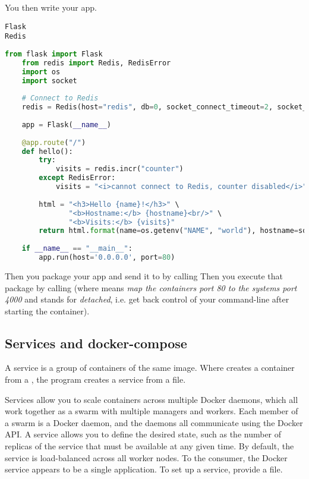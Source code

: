 You then write your app. 
\begin{lstlisting}[caption=requirements.txt]
Flask
Redis
\end{lstlisting}

\begin{lstlisting}[language=python, caption=main.py]
    from flask import Flask
    from redis import Redis, RedisError
    import os
    import socket
    
    # Connect to Redis
    redis = Redis(host="redis", db=0, socket_connect_timeout=2, socket_timeout=2)
    
    app = Flask(__name__)
    
    @app.route("/")
    def hello():
        try:
            visits = redis.incr("counter")
        except RedisError:
            visits = "<i>cannot connect to Redis, counter disabled</i>"
    
        html = "<h3>Hello {name}!</h3>" \
               "<b>Hostname:</b> {hostname}<br/>" \
               "<b>Visits:</b> {visits}"
        return html.format(name=os.getenv("NAME", "world"), hostname=socket.gethostname(), visits=visits)
    
    if __name__ == "__main__":
        app.run(host='0.0.0.0', port=80)
\end{lstlisting}
Then you package your app and send it to  by calling 
Then you execute that package by calling  (where  means \emph{map the containers port 80 to the systems port 4000} and  stands for \emph{detached}, i.e. get back control of your command-line after starting the container).


\subsection{Services and docker-compose}

A service is a group of containers of the same image. Where  creates a container from a , the program  creates a service from a  file. 

Services allow you to scale containers across multiple Docker daemons, which all work together as a swarm with multiple managers and workers. Each member of a swarm is a Docker daemon, and the daemons all communicate using the Docker API. A service allows you to define the desired state, such as the number of replicas of the service that must be available at any given time. By default, the service is load-balanced across all worker nodes. To the consumer, the Docker service appears to be a single application. 
To set up a service, provide a  file.

